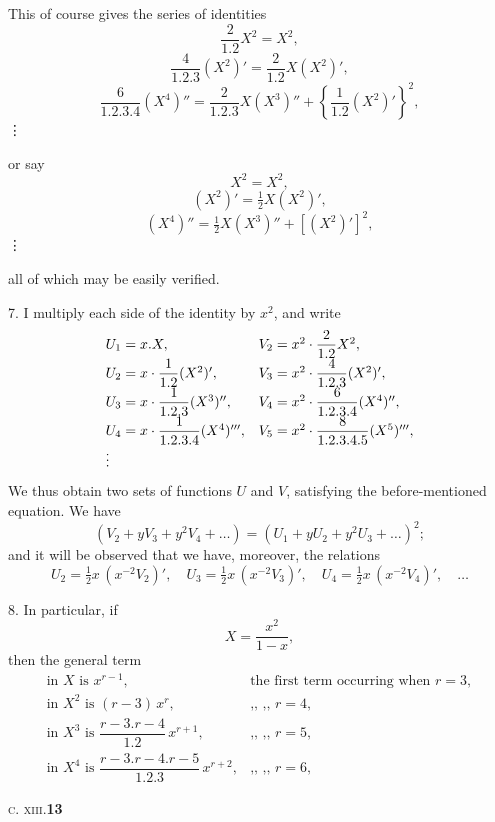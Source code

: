 \documentclass[11pt]{article}
\begin{document}
\smallskip
This of course gives the series of identities
\[
\frac{2}{1.2}X^{2}=X^{2},
\]
\[
\frac{4}{1.2.3}(X^{2})'=\frac{2}{1.2}X(X^{2})',
\]
\[
\frac{6}{1.2.3.4}(X^{4})''=\frac{2}{1.2.3}X(X^{3})''+\!\left\{\frac{1}{1.2}(X^{2})'\right\}^{2}\!,
\]
\hspace*{4em}\vdots

\noindent or say
\[
X^{2}=X^{2},
\]
\[
(X^{2})'=\tfrac{1}{2}X(X^{2})',
\]
\[
(X^{4})''=\tfrac{1}{2}X(X^{3})''+[(X^{2})']^{2},
\]
\hspace*{4em}\vdots

\noindent all of which may be easily verified.

\hspace{1em} 7. I multiply each side of the identity by $x^{2}$, and write
\[
\begin{array}{ll}
U_{1}=x.X, & V_{2}=x^{2}\cdot\dfrac{2}{1.2}X^{2},\\[4pt]
U_{2}=x\cdot\dfrac{1}{1.2}(X^{2})', & V_{3}=x^{2}\cdot\dfrac{4}{1.2.3}(X^{2})',\\[4pt]
U_{3}=x\cdot\dfrac{1}{1.2.3}(X^{3})'', & V_{4}=x^{2}\cdot\dfrac{6}{1.2.3.4}(X^{4})'',\\[4pt]
U_{4}=x\cdot\dfrac{1}{1.2.3.4}(X^{4})''', & V_{5}=x^{2}\cdot\dfrac{8}{1.2.3.4.5}(X^{5})''',\\[4pt]
\multicolumn{2}{l}{\vdots}
\end{array}
\]
We thus obtain two sets of functions $U$ and $V$, satisfying the
before-mentioned equation. We have
\[
(V_{2}+yV_{3}+y^{2}V_{4}+\ldots)=(U_{1}+yU_{2}+y^{2}U_{3}+\ldots)^{2};
\]
and it will be observed that we have, moreover, the relations
\[
U_{2}=\tfrac{1}{2}x\,(x^{-2}V_{2})',\quad U_{3}=\tfrac{1}{2}x\,(x^{-2}V_{3})',\quad U_{4}=\tfrac{1}{2}x\,(x^{-2}V_{4})',\quad\ldots
\]

\hspace{1em} 8. In particular, if
\[
X=\frac{x^{2}}{1-x},
\]
then the general term
\[
\begin{array}{ll}
\text{in } X \text{ is } x^{r-1}, & \text{the first term occurring when } r=3,\\
\text{in } X^{2} \text{ is } (r-3)\,x^{r}, & \text{,, ,, } r=4,\\
\text{in } X^{3} \text{ is } \dfrac{r-3.r-4}{1.2}\,x^{r+1}, & \text{,, ,, } r=5,\\
\text{in } X^{4} \text{ is } \dfrac{r-3.r-4.r-5}{1.2.3}\,x^{r+2}, & \text{,, ,, } r=6,
\end{array}
\]

\hfill\textsc{c. xiii.}\hfill\textbf{13}
\end{document}
